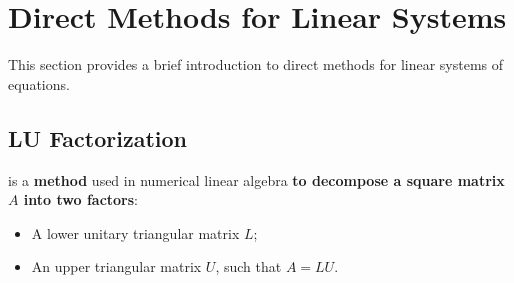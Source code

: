 \section{Direct Methods for Linear Systems}

This section provides a brief introduction to direct methods for linear systems of equations.

\subsection{LU Factorization}

 is a \textbf{method} used in numerical linear algebra \textbf{to decompose a square matrix $A$ into two factors}:
\begin{itemize}
    \item A lower unitary triangular matrix $L$;
    \item An upper triangular matrix $U$, such that $A = LU$.
\end{itemize}

